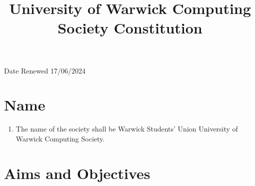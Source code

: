 \documentclass{article}
\title{\textbf{University of Warwick Computing Society Constitution} \vspace{-2cm}}
\author{}
\date{}
\begin{document}
\setcounter{sec}{0} 

\renewcommand{\labelenumi}{\arabic{section}.\arabic{enumi}}
\renewcommand{\labelenumii}{\arabic{section}.\arabic{enumi}.\arabic{enumii}}
\renewcommand{\labelenumiii}{\arabic{section}.\arabic{enumi}.\arabic{enumii}.\alph{enumiii}}
\maketitle

\begin{flushright}
    Date Renewed 17/06/2024
\end{flushright}

\section{Name}
\addtocounter{sec}{1}

\begin{enumerate}
    \item The name of the society shall be Warwick Students’ Union University of Warwick Computing Society.
\end{enumerate}

\section{Aims and Objectives}
\addtocounter{sec}{1}
\end{document}
